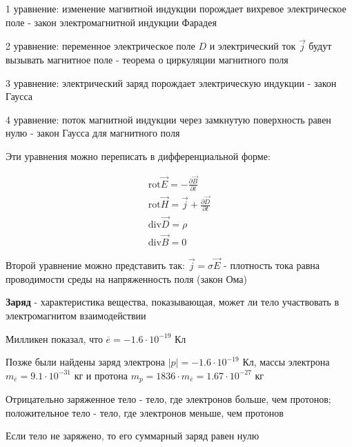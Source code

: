 \documentclass[12pt]{article}
\begin{document}
    1 уравнение: изменение магнитной индукции порождает вихревое электрическое поле - закон электромагнитной индукции Фарадея

    2 уравнение: переменное электрическое поле $D$ и электрический ток $\vec{j}$ будут вызывать магнитное поле - теорема о циркуляции магнитного поля

    3 уравнение: электрический заряд порождает электрическую индукции - закон Гаусса

    4 уравнение: поток магнитной индукции через замкнутую поверхность равен нулю - закон Гаусса для магнитного поля

    Эти уравнения можно переписать в дифференциальной форме:

    \begin{tcolorbox}[colframe=green!25, colback=green!10]
        \begin{gather*}
            \mathrm{rot} \vec{E} = -\frac{\partial \vec{B}}{\partial t}\\
            \mathrm{rot} \vec{H} = \vec{j} + \frac{\partial \vec{D}}{\partial t}\\
            \mathrm{div} \vec{D} = \rho\\
            \mathrm{div} \vec{B} = 0
        \end{gather*}
    \end{tcolorbox}

    Второй уравнение можно представить так: $\vec{j} = \sigma \vec{E}$ - 
    плотность тока равна проводимости среды на напряженность поля (закон Ома)

    \textbf{Заряд} - характеристика вещества, показывающая, может ли тело участвовать в электромагнитом взаимодействии

    Милликен показал, что $\overline{e} = -1.6 \cdot 10^{-19}$ Кл 

    Позже были найдены заряд электрона $|p| = -1.6 \cdot 10^{-19}$ Кл, массы электрона $m_{\overline{e}} = 9.1 \cdot 10^{-31}$ кг и протона $m_p = 1836 \cdot m_{\overline{e}} = 1.67 \cdot 10^{-27}$ кг

    Отрицательно заряженное тело - тело, где электронов больше, чем протонов; положительное тело - тело, где электронов меньше, чем протонов

    Если тело не заряжено, то его суммарный заряд равен нулю

    \smallvspace
\end{document}
